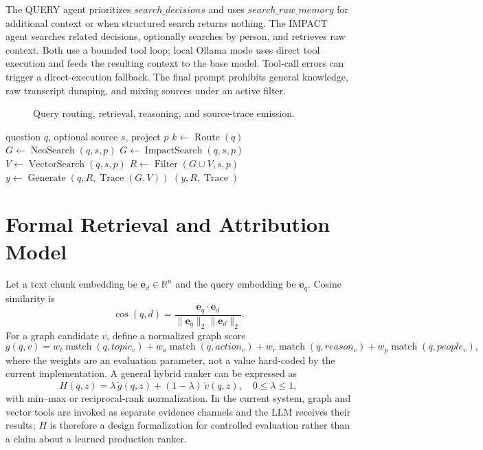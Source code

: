 \documentclass[conference]{IEEEtran}
\begin{document}
The QUERY agent prioritizes $search\_decisions$ and uses $search\_raw\_memory$ for additional context or when structured search returns nothing. The IMPACT agent searches related decisions, optionally searches by person, and retrieves raw context. Both use a bounded tool loop; local Ollama mode uses direct tool execution and feeds the resulting context to the base model. Tool-call errors can trigger a direct-execution fallback. The final prompt prohibits general knowledge, raw transcript dumping, and mixing sources under an active filter.

\begin{figure}[t]
\centering
\resizebox{\columnwidth}{!}{}
\caption{Query routing, retrieval, reasoning, and source-trace emission.}
\label{fig:agent}
\end{figure}

\begin{algorithm}[t]
\caption{Scoped hybrid query}
\label{alg:query}
\begin{algorithmic}[1]
\Require question $q$, optional source $s$, project $p$
\State $k\gets\operatorname{Route}(q)$
  \State $G\gets\operatorname{NeoSearch}(q,s,p)$
\Else
  \State $G\gets\operatorname{ImpactSearch}(q,s,p)$
\EndIf
\State $V\gets\operatorname{VectorSearch}(q,s,p)$
\State $R\gets\operatorname{Filter}(G\cup V,s,p)$
\State $y\gets\operatorname{Generate}(q,R,\operatorname{Trace}(G,V))$
\State \Return $(y,R,\operatorname{Trace})$
\end{algorithmic}
\end{algorithm}

\section{Formal Retrieval and Attribution Model}
Let a text chunk embedding be $\mathbf{e}_d\in\mathbb{R}^n$ and the query embedding be $\mathbf{e}_q$. Cosine similarity is
\begin{equation}
 \operatorname{cos}(q,d)=\frac{\mathbf{e}_q\cdot\mathbf{e}_d}{\|\mathbf{e}_q\|_2\|\mathbf{e}_d\|_2}.
\end{equation}
For a graph candidate $v$, define a normalized graph score
\begin{equation}
 g(q,v)=w_t\operatorname{match}(q,topic_v)+w_a\operatorname{match}(q,action_v)+w_r\operatorname{match}(q,reason_v)+w_p\operatorname{match}(q,people_v),
\end{equation}
where the weights are an evaluation parameter, not a value hard-coded by the current implementation. A general hybrid ranker can be expressed as
\begin{equation}
 H(q,z)=\lambda\,\widetilde{g}(q,z)+(1-\lambda)\,\widetilde{v}(q,z),\quad 0\leq\lambda\leq1,
\end{equation}
with min--max or reciprocal-rank normalization. In the current system, graph and vector tools are invoked as separate evidence channels and the LLM receives their results; $H$ is therefore a design formalization for controlled evaluation rather than a claim about a learned production ranker.
\end{document}
